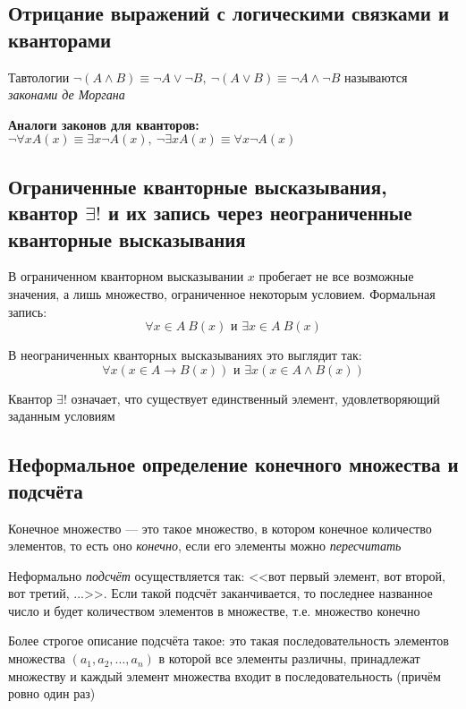 \documentclass[a4paper]{article}
\begin{document}
\subsection{Отрицание выражений с логическими связками и кванторами}
Тавтологии $\neg(A\wedge B)\equiv\neg A\vee\neg B,\ \neg(A\vee B)\equiv\neg A\wedge\neg B$ называются \textit{законами де Моргана}

\textbf{Аналоги законов для кванторов:} $\neg\forall xA(x)\equiv\exists x\neg A(x),\ \neg\exists xA(x)\equiv\forall x\neg A(x)$

\subsection{Ограниченные кванторные высказывания, квантор $\exists!$ и их запись через неограниченные кванторные высказывания}
В ограниченном кванторном высказывании $x$ пробегает не все возможные значения, а лишь множество, ограниченное некоторым условием. Формальная запись:
\begin{equation*}
    \forall x\in A\ B(x)\text{ и }\exists x\in A\ B(x)
\end{equation*}

В неограниченных кванторных высказываниях это выглядит так:
\begin{equation*}
    \forall x(x\in A\rightarrow B(x))\text{ и }\exists x(x\in A\wedge B(x))
\end{equation*}

 Квантор $\exists!$ означает, что существует единственный элемент, удовлетворяющий заданным условиям


\subsection{Неформальное определение конечного множества и подсчёта}
 Конечное множество — это такое множество, в котором конечное количество элементов, то есть оно \textit{конечно}, если его элементы можно \textit{пересчитать}

Неформально \textit{подсчёт} осуществляется так: <<вот первый элемент, вот второй, вот третий, ...>>. Если такой подсчёт заканчивается, то последнее названное число и будет количеством элементов в множестве, т.е. множество конечно

Более строгое описание подсчёта такое: это такая последовательность элементов множества $(a_1, a_2, \ldots, a_n)$ в которой все элементы различны, принадлежат множеству и каждый элемент множества входит в последовательность (причём ровно один раз)
\end{document}

